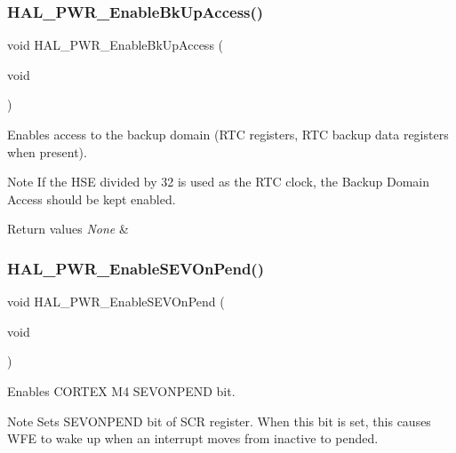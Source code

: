 \subsubsection{\texorpdfstring{H\+A\+L\+\_\+\+P\+W\+R\+\_\+\+Enable\+Bk\+Up\+Access()}{HAL\_PWR\_EnableBkUpAccess()}}
{\footnotesize\ttfamily void H\+A\+L\+\_\+\+P\+W\+R\+\_\+\+Enable\+Bk\+Up\+Access (\begin{DoxyParamCaption}\item[{void}]{ }\end{DoxyParamCaption})}



Enables access to the backup domain (R\+TC registers, R\+TC backup data registers when present). 

\begin{DoxyNote}{Note}
If the H\+SE divided by 32 is used as the R\+TC clock, the Backup Domain Access should be kept enabled. 
\end{DoxyNote}

\begin{DoxyRetVals}{Return values}
{\em None} & \\
\hline
\end{DoxyRetVals}
\mbox{\label{group___p_w_r___exported___functions___group2_ga6f33b1c8c8cc85129c68ac302a281033}} 
\subsubsection{\texorpdfstring{H\+A\+L\+\_\+\+P\+W\+R\+\_\+\+Enable\+S\+E\+V\+On\+Pend()}{HAL\_PWR\_EnableSEVOnPend()}}
{\footnotesize\ttfamily void H\+A\+L\+\_\+\+P\+W\+R\+\_\+\+Enable\+S\+E\+V\+On\+Pend (\begin{DoxyParamCaption}\item[{void}]{ }\end{DoxyParamCaption})}



Enables C\+O\+R\+T\+EX M4 S\+E\+V\+O\+N\+P\+E\+ND bit. 

\begin{DoxyNote}{Note}
Sets S\+E\+V\+O\+N\+P\+E\+ND bit of S\+CR register. When this bit is set, this causes W\+FE to wake up when an interrupt moves from inactive to pended. 
\end{DoxyNote}

